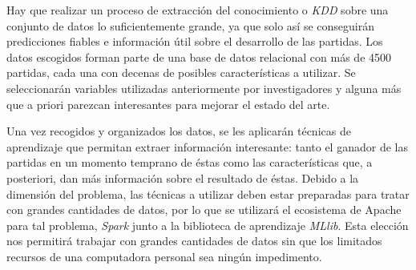 Hay que realizar un proceso de extracción del
conocimiento o \emph{KDD} sobre una conjunto de datos lo suficientemente
grande, ya que solo así se conseguirán predicciones fiables e información útil
sobre el desarrollo de las partidas.
Los datos escogidos forman parte de una
base de datos relacional con más de 4500 partidas, cada una con decenas de posibles
características a utilizar. Se seleccionarán variables utilizadas anteriormente
por investigadores y alguna más que a priori parezcan interesantes para mejorar
el estado del arte.

Una vez recogidos y organizados los datos, se les aplicarán técnicas de
aprendizaje que permitan extraer información interesante: tanto el ganador
de las partidas en un momento temprano de éstas como las características que,
a posteriori, dan más información sobre el resultado de éstas. Debido a la
dimensión del problema, las técnicas a utilizar deben estar preparadas para
tratar con grandes cantidades de datos, por lo que se utilizará el ecosistema
de Apache para tal problema, \emph{Spark} junto a la biblioteca de aprendizaje
\emph{MLlib}. Esta elección nos permitirá trabajar con grandes cantidades de
datos sin que los limitados recursos de una computadora personal sea ningún
impedimento.

